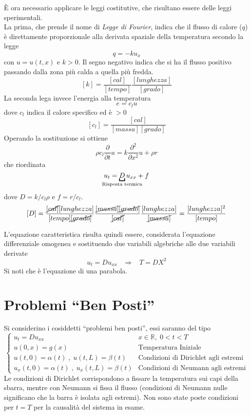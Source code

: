 \`E ora necessario applicare le leggi costitutive, che risultano essere delle leggi sperimentali.\\
La prima, che prende il nome di \textit{Legge di Fourier}, indica che il flusso di calore ($q$) \`e direttamente proporzionale
alla derivata spaziale della temperatura secondo la legge
\[
	q= -ku_x
\]
con $u=u(t,x)$ e $k>0$. Il segno negativo indica che si ha il flusso positivo passando dalla zona pi\`u calda a quella pi\`u fredda.
\[
	[k]= \frac{[cal]}{[tempo]}\frac{[lunghezza]}{[grado]}
\]
La seconda lega invece l'energia alla temperatura
\[
	e= c_lu
\]
dove $c_l$ indica il calore specifico ed \`e $>0$
\[
	[c_l]=\frac{[cal]}{[massa][grado]}
\]
Operando la sostituzione si ottiene
\[
	\rho c_l \frac{\partial}{\partial t} u= k \frac{\partial^2}{\partial x^2}u + \rho r
\]
che riordinata
\[
	u_t= \underbracket{D}_{\mathclap{\text{Risposta termica}}} u_{xx}+f
\]
dove $D=k/c_l\rho$ e $f=r/c_l$.
\[
	[D]=\frac{\cancel{[cal]}[lunghezza]}{[tempo]\cancel{[grado]}}\frac{\cancel{[massa]}\cancel{[grado]}}{\cancel{[cal]}}
	\frac{[lunghezza]}{\cancel{[massa]}}=\frac{[lunghezza]^2}{[tempo]}
\]

L'equazione caratteristica risulta quindi essere, considerata l'equazione differenziale omogenea e sostituendo due variabili algebriche alle due variabili derivate
\[
	u_t= Du_{xx} \;\;\; \Rightarrow \;\;\; T=DX^2
\]
Si noti che \`e l'equazione di una parabola.

\section{Problemi ``Ben Posti''}
Si considerino i cosiddetti ``problemi ben posti'', essi saranno del tipo
\[
	\left\{
	\begin{array}{ll}
		u_t=Du_{xx} & x\in\mathbb{R}, \; 0<t<T \\
		u(0,x)=g(x) & \text{Temperatura Iniziale}\\
		u(t,0)=\alpha(t) \; , \; u(t,L)=\beta(t) & \text{Condizioni di Dirichlet agli estremi}\\
		u_x(t,0)=\alpha(t) \; , \; u_x(t,L)=\beta(t) & \text{Condizioni di Neumann agli estremi}
	\end{array}
	\right.
\]
Le condizioni di Dirichlet corrispondono a fissare la temperatura sui capi della sbarra, mentre con Neumann si fissa
il flusso (condizioni di Neumann nulle significano che la barra \`e isolata agli estremi). Non sono state poste condizioni per $t=T$
per la causalit\`a del sistema in esame.

